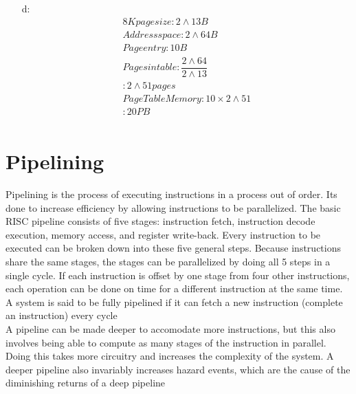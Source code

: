 \documentclass[letterpaper,10pt,titlepage,fleqn]{article}
\begin{document}
\begin{itemize}
        \item[d:] 
          \begin{align*}
                    8K page size      : 2\wedge13B \\
                    Address space     : 2\wedge64B \\
                    Page entry        : 10B  \\
                    Pages in table    : \dfrac{2\wedge64}{2\wedge13} \\
                                      : 2\wedge51 pages \\
                    Page Table Memory : 10\times2\wedge51 \\
                                      : 20PB \\
                \end{align*}
    \end{itemize}
\pagebreak

\section{Pipelining}
    
        Pipelining is the process of executing instructions in a process out of order. 
    Its done to increase efficiency by allowing instructions to be parallelized. 
    The basic RISC pipeline consists of five stages: instruction fetch, instruction decode
    execution, memory access, and register write-back. Every instruction to be executed can 
    be broken down into these five general steps. Because instructions share the same stages, 
    the stages can be parallelized by doing all 5 steps in a single cycle. If each instruction is offset
    by one stage from four other instructions, each operation can be done on time for a different instruction
    at the same time. A system is said to be fully pipelined if it can fetch a new instruction (complete an instruction)
    every cycle\\
    
        A pipeline can be made deeper to accomodate more instructions, but this also involves being able 
    to compute as many stages of the instruction in parallel. Doing this takes more circuitry and increases 
    the complexity of the system. A deeper pipeline also invariably increases hazard events, which are the 
    cause of the diminishing returns of a deep pipeline\\

\pagebreak
\end{document}

